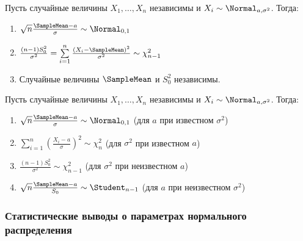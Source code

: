 \begin{namedthm}
Пусть случайные величины $X_1, \ldots, X_n$ независимы и ${X_i \sim \Normal_{a,\sigma^{2}}}$. Тогда:
\begin{enumerate}
    \item $\sqrt{n} \frac{\SampleMean-a}{\sigma} \sim \Normal_{0,1}$
    \item $\frac{(n-1) S_{0}^{2}}{\sigma^{2}}=\sum\limits_{i=1}^{n} \frac{\left(X_{i}-\SampleMean\right)^{2}}{\sigma^{2}} \sim \chi^{2}_{n-1}$
    \item Случайные величины $\SampleMean$ и $S_{0}^{2}$ независимы.
\end{enumerate}
\end{namedthm}
\begin{crlr}
    Пусть случайные величины $X_1, \ldots, X_n$ независимы и ${X_i \sim \Normal_{a,\sigma^{2}}}$. Тогда:
    \begin{enumerate}
        \item $\sqrt{n} \frac{\SampleMean-a}{\sigma} \sim \Normal_{0,1}$ (для $a$ при известном $\sigma^{2}$)
        \item $\sum\limits_{i=1}^{n}\left(\frac{X_{i}-a}{\sigma}\right)^{2} \sim \chi^{2}_{n}$ (для $\sigma^{2}$ при известном $a$)
        \item $\frac{(n-1) S_{0}^{2}}{\sigma^{2}} \sim \chi^{2}_{n-1}$ (для $\sigma^{2}$ при неизвестном $a$)
        \item $\sqrt{n} \frac{\SampleMean-a}{S_{0}} \sim \Student_{n-1}$ (для $a$ при неизвестном $\sigma^{2}$)
    \end{enumerate}
\end{crlr}

\subsubsection{Статистические выводы о параметрах нормального распределения}

